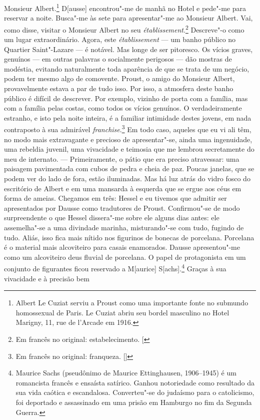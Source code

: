 Monsieur Albert.\footnote{Albert Le Cuziat
  serviu a Proust como uma importante fonte no submundo homossexual de
  Paris. Le Cuziat abriu seu bordel
  masculino no Hotel Marigny, 11, rue de l'Arcade em 1916. \versal{[N.~O.]}}
D{[}ausse{]} encontrou"-me de manhã no Hotel e pede"-me para reservar a
noite. Busca"-me às sete para apresentar"-me ao Monsieur Albert. Vai, como
disse, visitar o Monsieur Albert no seu \emph{établissement}.\footnote{Em francês no original: estabelecimento. {[}\versal{N.~T.}{]}} Descreve"-o
como um lugar extraordinário. Agora, este \emph{établissement} --- um
banho público no Quartier Saint"-Lazare --- é notável. Mas longe de ser
pitoresco. Os vícios graves, genuínos --- em outras palavras o
socialmente perigosos --- dão mostras de modéstia, evitando naturalmente
toda aparência de que se trata de um negócio, podem ter mesmo algo de
comovente. Proust, o amigo do Monsieur Albert, provavelmente estava a
par de tudo isso. Por isso, a atmosfera deste banho público é difícil de
descrever. Por exemplo, vizinho de porta com a família, mas com a
família pelas costas, como todos os vícios genuínos. O verdadeiramente
estranho, e isto pela noite inteira, é a familiar intimidade destes
jovens, em nada contraposto à sua admirável \emph{franchise}.\footnote{Em francês no original: franqueza. []} Em
todo caso, aqueles que eu vi ali têm, no modo mais extravagante e
precioso de apresentar"-se, ainda uma ingenuidade, uma rebeldia juvenil,
uma vivacidade e teimosia que me lembrou secretamente do meu de
internato. --- Primeiramente, o pátio que era preciso atravessar: uma paisagem pavimentada com cubos de pedra e cheia de paz. Poucas janelas, que se podem ver do lado de
fora, estão iluminadas. Mas há luz atrás do vidro fosco do escritório de Albert e
em uma mansarda à esquerda que se ergue aos céus em forma de ameias. Chegamos
em três: Hessel e eu tivemos que admitir ser apresentados por Dausse como
tradutores de Proust. Confirmou"-se de modo surpreendente o que Hessel
dissera"-me sobre ele alguns dias antes: ele assemelha"-se a uma divindade
marinha, misturando"-se com tudo, fugindo de tudo. Aliás, isso fica mais
nítido nos figurinos de bonecas de porcelana. Porcelana é o material
mais alcoviteiro para casais enamorados. Dausse apresentou"-me como um %
alcoviteiro deus fluvial de porcelana. O papel de protagonista em um
conjunto de figurantes ficou reservado a M{[}aurice{]}
S{[}achs{]}.\footnote{Maurice Sachs (pseudônimo de Maurice
  Ettinghausen, 1906--1945) é um romancista francês e ensaísta satírico.
  Ganhou notoriedade como resultado da sua vida caótica e escandalosa.
  Converteu"-se do judaísmo para o catolicismo,
  foi deportado e assassinado em uma prisão em Hamburgo no
  fim da Segunda Guerra. \versal{[N.~O.]}} Graças à sua vivacidade e à precisão bem
